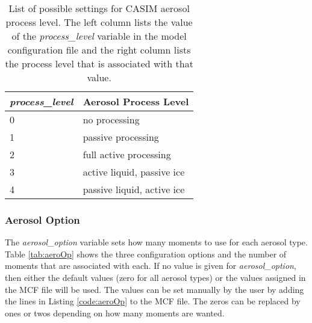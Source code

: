 \begin{table}[H]
	\centering
	\caption{List of possible settings for CASIM aerosol process level. The left column lists the value of the \textit{process\_level} variable in the model configuration file and the right column lists the process level that is associated with that value.}
	\label{tab:proc}
	\begin{tabular}{|l|l|}
		\hline
		\textit{\textbf{process\_level}} & \textbf{Aerosol Process Level} \\ \hline
		0                                & no processing                  \\ \hline
		1                                & passive processing             \\ \hline
		2                                & full active processing         \\ \hline
		3                                & active liquid, passive ice     \\ \hline
		4                                & passive liquid, active ice     \\ \hline
	\end{tabular}
\end{table}

\subsubsection{Aerosol Option}
The \textit{aerosol\_option} variable sets how many moments to use for each aerosol type. Table \ref{tab:aeroOp} shows the three configuration options and the number of moments that are associated with each. If no value is given for \textit{aerosol\_option}, then either the default values (zero for all aerosol types) or the values assigned in the MCF file will be used. The values can be set manually by the user by adding the lines in Listing \ref{code:aeroOp} to the MCF file. The zeros can be replaced by ones or twos depending on how many moments are wanted. \citep{casimCode}

